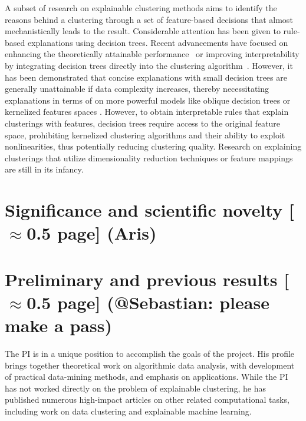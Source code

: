 \documentclass[a4paper,11pt]{article}
\begin{document}
A subset of research on explainable clustering methods aims to identify the reasons behind a clustering through a set of feature-based decisions that almost mechanistically leads to the result. 
Considerable attention has been given to rule-based explanations using decision trees. 
Recent advancements have focused on enhancing the theoretically attainable performance~\cite{todo,todo,todo} or improving interpretability by integrating decision trees directly into the clustering algorithm~\cite{}. 
However, it has been demonstrated that concise explanations with small decision trees are generally unattainable if data complexity increases, 
thereby necessitating explanations in terms of on more powerful models like oblique decision trees \cite{} or kernelized features spaces \cite{}.
However, to obtain interpretable rules that explain clusterings with features, decision trees require access to the original feature space, prohibiting kernelized clustering algorithms and their ability to exploit nonlinearities, thus potentially reducing clustering quality.
Research on explaining clusterings that utilize dimensionality reduction techniques or feature mappings are still in its infancy.

\section{Significance and scientific novelty  {\color{orange}[$\approx$0.5 page]} {\color{teal}(Aris)}}


\section{Preliminary and previous results  {\color{orange}[$\approx$0.5 page]} {\color{teal}(@Sebastian: please make a pass)}}


The PI is in a unique position to accomplish the goals of the project. 
His profile brings together theoretical work on algorithmic data analysis, 
with development of practical data-mining methods, and emphasis on applications. 
While the PI has not worked directly on the problem of explainable clustering,
he has published numerous high-impact articles on other related computational tasks, 
including work on data clustering and explainable machine learning. 
\end{document}

